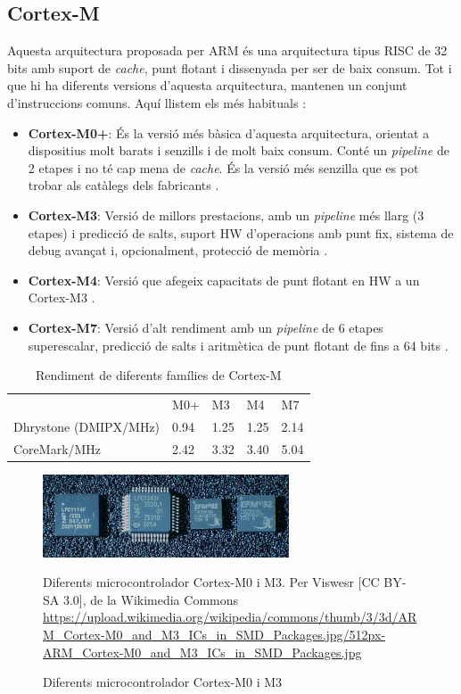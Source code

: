 \subsection{Cortex-M}
Aquesta arquitectura proposada per ARM és una arquitectura tipus RISC de 32 bits amb suport de {\em cache}, punt flotant i dissenyada per ser de baix consum. Tot i que hi ha diferents versions d'aquesta arquitectura, mantenen un conjunt d'instruccions comuns. Aquí llistem els més habituals \cite[7]{EmbeddedBook}:

\begin{itemize}
 \item {\bf Cortex-M0+}: És la versió més bàsica d'aquesta arquitectura, orientat a dispositius molt barats i senzills i de molt baix consum. Conté un {\em pipeline} de 2 etapes i no té cap mena de {\em cache}. És la versió més senzilla que es pot trobar als catàlegs dels fabricants \cite{CortexM0}.
 \item {\bf Cortex-M3}: Versió de millors prestacions, amb un {\em pipeline} més llarg (3 etapes) i predicció de salts, suport HW d'operacions amb punt fix, sistema de debug avançat i, opcionalment, protecció de memòria \cite{CortexM3}.
 \item {\bf Cortex-M4}: Versió que afegeix capacitats de punt flotant en HW a un Cortex-M3 \cite{CortexM4}.
 \item {\bf Cortex-M7}: Versió d'alt rendiment amb un {\em pipeline} de 6 etapes superescalar, predicció de salts i aritmètica de punt flotant de fins a 64 bits \cite{CortexM7}.
\end{itemize}

\begin{table}
\caption{Rendiment de diferents famílies de Cortex-M \cite[22]{DesignersGuide}}
\centering
\begin{tabular}{lllll}
 & M0+ & M3 & M4 & M7\\
Dhrystone (DMIPX/MHz) & 0.94 & 1.25 & 1.25 & 2.14\\
CoreMark/MHz & 2.42 & 3.32 & 3.40 & 5.04\\
\end{tabular}
\label{tab:ARMPerformances}
\end{table}



\begin{figure}
 \centering
 \includegraphics[width=0.65\textwidth, keepaspectratio]{imatges/ARM_Cortex-M0}
 \caption{Diferents microcontrolador Cortex-M0 i M3}{Diferents microcontrolador Cortex-M0 i M3. Per Viswesr [CC BY-SA 3.0], de la Wikimedia Commons \url{https://upload.wikimedia.org/wikipedia/commons/thumb/3/3d/ARM_Cortex-M0_and_M3_ICs_in_SMD_Packages.jpg/512px-ARM_Cortex-M0_and_M3_ICs_in_SMD_Packages.jpg}}
 \label{fig:STAsic}
\end{figure}

